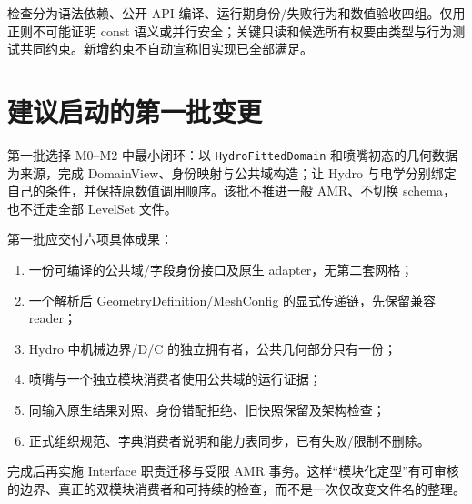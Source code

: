 \documentclass[UTF8,a4paper,11pt,fontset=fandol]{ctexart}
\newcommand{\code}[1]{\nolinkurl{#1}}
\begin{document}
检查分为语法依赖、公开 API 编译、运行期身份/失败行为和数值验收四组。仅用正则不可能证明 const 语义或并行安全；关键只读和候选所有权要由类型与行为测试共同约束。新增约束不自动宣称旧实现已全部满足。

\section{建议启动的第一批变更}
第一批选择 M0--M2 中最小闭环：以 \code{HydroFittedDomain} 和喷嘴初态的几何数据为来源，完成 DomainView、身份映射与公共域构造；让 Hydro 与电学分别绑定自己的条件，并保持原数值调用顺序。该批不推进一般 AMR、不切换 schema，也不迁走全部 LevelSet 文件。

第一批应交付六项具体成果：
\begin{enumerate}
\item 一份可编译的公共域/字段身份接口及原生 adapter，无第二套网格；
\item 一个解析后 GeometryDefinition/MeshConfig 的显式传递链，先保留兼容 reader；
\item Hydro 中机械边界/D/C 的独立拥有者，公共几何部分只有一份；
\item 喷嘴与一个独立模块消费者使用公共域的运行证据；
\item 同输入原生结果对照、身份错配拒绝、旧快照保留及架构检查；
\item 正式组织规范、字典消费者说明和能力表同步，已有失败/限制不删除。
\end{enumerate}
完成后再实施 Interface 职责迁移与受限 AMR 事务。这样“模块化定型”有可审核的边界、真正的双模块消费者和可持续的检查，而不是一次仅改变文件名的整理。

\appendix
\clearpage
\end{document}
